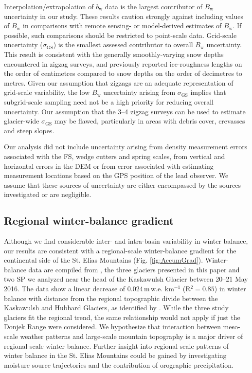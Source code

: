 \documentclass[twocolumn, letterpaper]{igs}
\begin{document}
Interpolation/extrapolation of $b_\mathrm{w}$ data is the largest contributor of $B_\mathrm{w}$ uncertainty in our study. These results caution strongly against including values of $B_\mathrm{w}$ in comparisons with remote sensing- or model-derived estimates of $B_\mathrm{w}$. If possible, such comparisons should be restricted to point-scale data. Grid-scale uncertainty ($\sigma_{\mathrm{GS}}$) is the smallest assessed contributor to overall $B_\mathrm{w}$ uncertainty. This result is consistent with the generally smoothly-varying snow depths encountered in zigzag surveys, and previously reported ice-roughness lengths on the order of centimetres \citep[e.g.][]{Hock2005} compared to snow depths on the order of decimetres to metres. Given our assumption that zigzags are an adequate representation of grid-scale variability, the low $B_\mathrm{w}$ uncertainty arising from $\sigma_{\mathrm{GS}}$ implies that subgrid-scale sampling need not be a high priority for reducing overall uncertainty. Our assumption that the 3--4 zigzag surveys can be used to estimate glacier-wide $\sigma_{\mathrm{GS}}$ may be flawed, particularly in areas with debris cover, crevasses and steep slopes.

Our analysis did not include uncertainty arising from density measurement errors associated with the FS, wedge cutters and spring scales, from vertical and horizontal errors in the DEM or from error associated with estimating measurement locations based on the GPS position of the lead observer. We assume that these sources of uncertainty are either encompassed by the sources investigated or are negligible.


\subsection{Regional winter-balance gradient}

Although we find considerable inter- and intra-basin variability in winter balance, our results are consistent with a regional-scale winter-balance gradient for the continental side of the St. Elias Mountains (Fig. \ref{fig:AccumGrad}). Winter-balance data are compiled from \cite{Taylor1969}, the three glaciers presented in this paper and two SP we analyzed near the head of the Kaskawulsh Glacier between 20--21 May 2016. The data show a linear decrease of $0.024$\,m\,w.e. km$^{-1}$ (R$^2=0.85$) in winter balance with distance from the regional topographic divide between the Kaskawulsh and Hubbard Glaciers, as identified by \cite{Taylor1969}. While the three study glaciers fit the regional trend, the same relationship would not apply if just the Donjek Range were considered. We hypothesize that interaction between meso-scale weather patterns and large-scale mountain topography is a major driver of regional-scale winter balance. Further insight into regional-scale patterns of winter balance in the St. Elias Mountains could be gained by investigating moisture source trajectories and the contribution of orographic precipitation. 
\end{document}

